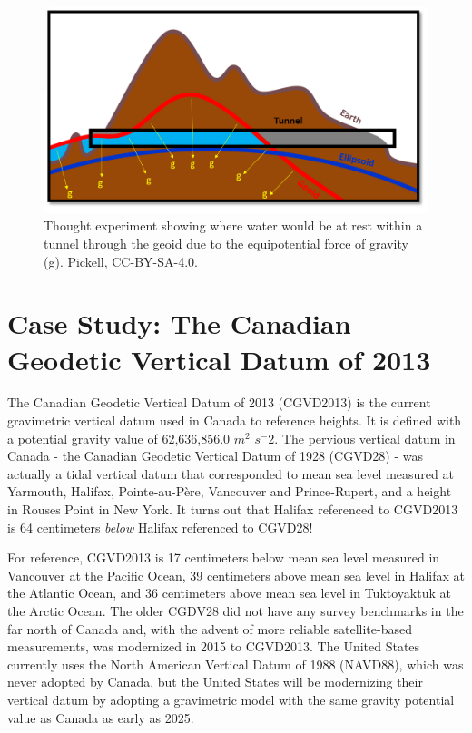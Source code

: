 \documentclass[
]{book}
\begin{document}
\begin{figure}
\includegraphics[width=0.75\linewidth]{images/02-geoid-tunnel} \caption{Thought experiment showing where water would be at rest within a tunnel through the geoid due to the equipotential force of gravity (g). Pickell, CC-BY-SA-4.0.}\label{fig:2-geoid-tunnel}
\end{figure}

\hypertarget{case-study-the-canadian-geodetic-vertical-datum-of-2013}{%
\section{Case Study: The Canadian Geodetic Vertical Datum of 2013}\label{case-study-the-canadian-geodetic-vertical-datum-of-2013}}

The Canadian Geodetic Vertical Datum of 2013 (CGVD2013) is the current gravimetric vertical datum used in Canada to reference heights. It is defined with a potential gravity value of 62,636,856.0 \(m^2\) \(s^-2\). The pervious vertical datum in Canada - the Canadian Geodetic Vertical Datum of 1928 (CGVD28) - was actually a tidal vertical datum that corresponded to mean sea level measured at Yarmouth, Halifax, Pointe-au-Père, Vancouver and Prince-Rupert, and a height in Rouses Point in New York. It turns out that Halifax referenced to CGVD2013 is 64 centimeters \emph{below} Halifax referenced to CGVD28!

For reference, CGVD2013 is 17 centimeters below mean sea level measured in Vancouver at the Pacific Ocean, 39 centimeters above mean sea level in Halifax at the Atlantic Ocean, and 36 centimeters above mean sea level in Tuktoyaktuk at the Arctic Ocean. The older CGDV28 did not have any survey benchmarks in the far north of Canada and, with the advent of more reliable satellite-based measurements, was modernized in 2015 to CGVD2013. The United States currently uses the North American Vertical Datum of 1988 (NAVD88), which was never adopted by Canada, but the United States will be modernizing their vertical datum by adopting a gravimetric model with the same gravity potential value as Canada as early as 2025.
\end{document}
